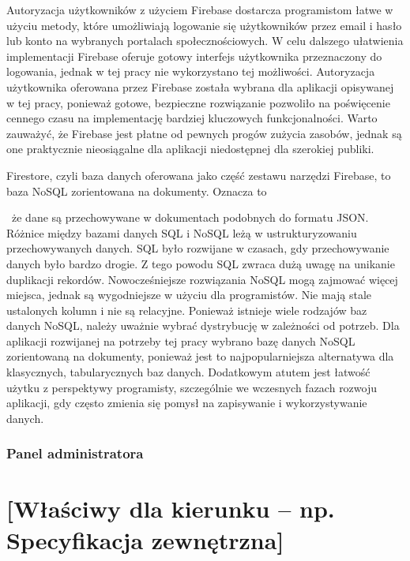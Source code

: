 \documentclass[a4paper,twoside,12pt]{book}
\newcommand{\ksremark}[1]{%
{%
{\color{brickred}{[#1]}}}%
\addcontentsline{rks}{uwagas}{\protect{#1}}%
}
\newcommand{\comma}{\ksremark{przecinek}}
\begin{document}
Autoryzacja użytkowników z użyciem Firebase dostarcza programistom łatwe w użyciu metody, które umożliwiają logowanie się użytkowników przez email i hasło lub konto na wybranych portalach społecznościowych. W celu dalszego ułatwienia implementacji Firebase oferuje gotowy interfejs użytkownika przeznaczony do logowania, jednak w tej pracy nie wykorzystano tej możliwości. Autoryzacja użytkownika oferowana przez Firebase została wybrana dla aplikacji opisywanej w tej pracy, ponieważ gotowe, bezpieczne rozwiązanie pozwoliło na poświęcenie cennego czasu na implementację bardziej kluczowych funkcjonalności. Warto zauważyć, że Firebase jest płatne od pewnych progów zużycia zasobów, jednak są one praktycznie nieosiągalne dla aplikacji niedostępnej dla szerokiej publiki.

Firestore, czyli baza danych oferowana jako część zestawu narzędzi Firebase, to baza NoSQL zorientowana na dokumenty. Oznacza to \comma\ że dane są przechowywane w dokumentach podobnych do formatu JSON. Różnice między bazami danych SQL i NoSQL leżą w ustrukturyzowaniu przechowywanych danych. SQL było rozwijane w czasach, gdy przechowywanie danych było bardzo drogie. Z tego powodu SQL zwraca dużą uwagę na unikanie duplikacji rekordów. Nowocześniejsze rozwiązania NoSQL mogą zajmować więcej miejsca, jednak są wygodniejsze w użyciu dla programistów. Nie mają stale ustalonych kolumn i nie są relacyjne. Ponieważ istnieje wiele rodzajów baz danych NoSQL, należy uważnie wybrać dystrybucję w zależności od potrzeb. Dla aplikacji rozwijanej na potrzeby tej pracy wybrano bazę danych NoSQL zorientowaną na dokumenty, ponieważ jest to najpopularniejsza alternatywa dla klasycznych, tabularycznych baz danych. Dodatkowym atutem jest łatwość użytku z perspektywy programisty, szczególnie we wczesnych fazach rozwoju aplikacji, gdy często zmienia się pomysł na zapisywanie i wykorzystywanie danych. 

\subsection{Panel administratora}



\chapter{[Właściwy dla kierunku -- np. Specyfikacja zewnętrzna]}
\label{ch:04}
\end{document}
